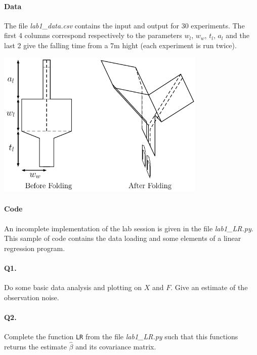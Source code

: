 \documentclass[12pt]{scrartcl}
\begin{document}
\paragraph{Data} The file \emph{lab1\_data.csv} contains the input and output for 30 experiments. The first 4 columns correspond respectively to the parameters $w_l$, $w_w$, $t_l$, $a_l$ and the last 2 give the falling time from a 7m hight (each experiment is run twice).
\begin{center}
	\includegraphics[width=10cm]{figures/helico.pdf}
\end{center}

\paragraph{Code} An incomplete implementation of the lab session is given in the file \emph{lab1\_LR.py}. This sample of code contains the data loading and some elements of a linear regression program.

\paragraph{Q1.} Do some basic data analysis and plotting on $X$ and $F$. Give an estimate of the observation noise.

\paragraph{Q2.} Complete the function \texttt{LR} from the file \emph{lab1\_LR.py} such that this functions returns the estimate $\hat{\beta}$ and its covariance matrix.
\end{document}
